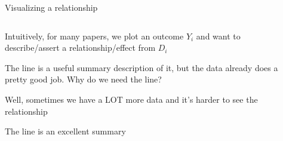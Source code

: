 \documentclass[notes,11pt, aspectratio=169]{beamer}
\newenvironment{wideitemize}{\itemize\addtolength{\itemsep}{10pt}}{\enditemize}
\begin{document}
\begin{frame}{Visualizing a relationship}
  \begin{columns}[T] %
    \begin{column}{.5\textwidth}
      \begin{wideitemize}
  \item<1-> Intuitively, for many papers, we plot an outcome $Y_{i}$ and
    want to describe/assert a relationship/effect from $D_{i}$
  \item<1-> The line is a useful summary description of it, but the
    data already does a pretty good job. Why do we need the line?
  \item<2-> Well, sometimes we have a LOT more data and it's harder to
    see the relationship
  \item<2-> The line is an excellent summary
  \end{wideitemize}
  \end{column}%
  \hfill%
  \begin{column}{.5\textwidth}
  \end{column}
\end{columns}
\end{frame}
\end{document}
